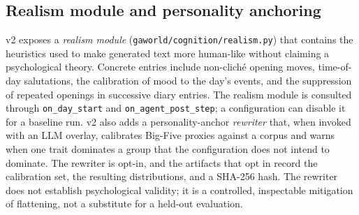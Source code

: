 \subsection{Realism module and personality anchoring}
\label{sec:memory:realism}

v2 exposes a \emph{realism module} (\texttt{gaworld/cognition/realism.py})
that contains the heuristics used to make generated text more human-like
without claiming a psychological theory.  Concrete entries include
non-clich\'e opening moves, time-of-day salutations, the calibration of
mood to the day's events, and the suppression of repeated openings in
successive diary entries.  The realism module is consulted through
\texttt{on\_day\_start} and \texttt{on\_agent\_post\_step}; a configuration
can disable it for a baseline run.  v2 also adds a personality-anchor
\emph{rewriter} that, when invoked with an LLM overlay, calibrates Big-Five
proxies against a corpus and warns when one trait dominates a group that the
configuration does not intend to dominate.  The rewriter is opt-in, and the
artifacts that opt in record the calibration set, the resulting
distributions, and a SHA-256 hash.  The rewriter does not establish
psychological validity; it is a controlled, inspectable mitigation of
flattening, not a substitute for a held-out evaluation.
